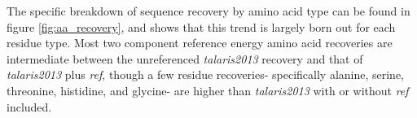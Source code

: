 The specific breakdown of sequence recovery by amino acid type can be found in figure \ref{fig:aa_recovery}, and shows that this trend is largely born out for each residue type.
Most two component reference energy amino acid recoveries are intermediate between the unreferenced \textit{talaris2013} recovery and that of \textit{talaris2013} plus \textit{ref}, though a few residue recoveries- specifically alanine, serine, threonine, histidine, and glycine- are higher than \textit{talaris2013} with or without \textit{ref} included.




